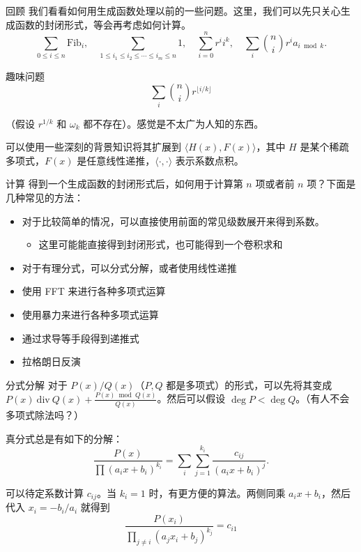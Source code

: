 \begin{frame}{回顾}
    我们看看如何用生成函数处理以前的一些问题。这里，我们可以先只关心生成函数的封闭形式，等会再考虑如何计算。
    $$
    \sum_{0\le i\le n}\mathrm{Fib}_i,\quad \sum_{1\le i_1\le i_2\le\cdots\le i_m\le n} 1,\quad     \sum_{i=0}^n r^ii^k,\quad \sum_i\binom{n}{i}r^ia_{i\bmod k}.
    $$
\end{frame}
\begin{frame}{趣味问题}
    $$
    \sum_i\binom{n}{i}r^{\lfloor i/k\rfloor}
    $$

    （假设 $r^{1/k}$ 和 $\omega_k$ 都不存在）。感觉是不太广为人知的东西。

    可以使用一些深刻的背景知识将其扩展到 $\langle H(x),F(x)\rangle$，其中 $H$ 是某个稀疏多项式，$F(x)$ 是任意线性递推，$\langle \cdot,\cdot\rangle$ 表示系数点积。
\end{frame}
\begin{frame}{计算}
    得到一个生成函数的封闭形式后，如何用于计算第 $n$ 项或者前 $n$ 项？下面是几种常见的方法：
    \begin{itemize}
        \item 对于比较简单的情况，可以直接使用前面的常见级数展开来得到系数。
            \begin{itemize}
                \item 这里可能能直接得到封闭形式，也可能得到一个卷积求和
            \end{itemize}
        \item 对于有理分式，可以分式分解，或者使用线性递推
        \item 使用 FFT 来进行各种多项式运算
        \item 使用暴力来进行各种多项式运算
        \item 通过求导等手段得到递推式
        \item 拉格朗日反演
    \end{itemize}
\end{frame}
\begin{frame}{分式分解}
    对于 $P(x)/Q(x)$（$P,Q$ 都是多项式）的形式，可以先将其变成 $P(x)\ \mathrm{div}\ Q(x)+\frac{P(x)\bmod Q(x)}{Q(x)}$。然后可以假设 $\deg P<\deg Q$。（有人不会多项式除法吗？）

    真分式总是有如下的分解：
    $$
    \frac{P(x)}{\prod{(a_ix+b_i)^{k_i}}}=\sum_i\sum_{j=1}^{k_i}\frac{c_{ij}}{(a_ix+b_i)^{j}}.
    $$

    可以待定系数计算 $c_{ij}$。当 $k_i=1$ 时，有更方便的算法。两侧同乘 $a_ix+b_i$，然后代入 $x_i=-b_i/a_i$ 就得到
    $$
    \frac{P(x_i)}{\prod_{j\ne i}(a_jx_i+b_j)^{k_j}}=c_{i1}
    $$
\end{frame}
